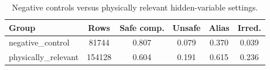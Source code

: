 \begin{table}[t]
\centering
\caption{Negative controls versus physically relevant hidden-variable settings.}
\label{tab:negative-controls}
\small
\begin{tabular}{lccccc}
\toprule
Group & Rows & Safe comp. & Unsafe & Alias & Irred. \\
\midrule
negative\_control & 81744 & 0.807 & 0.079 & 0.370 & 0.039 \\
physically\_relevant & 154128 & 0.604 & 0.191 & 0.615 & 0.236 \\
\bottomrule
\end{tabular}
\end{table}
